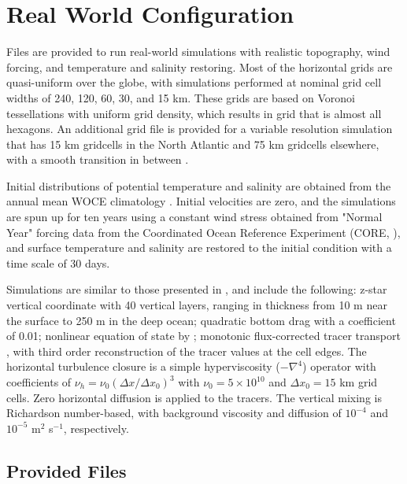 \section{Real World Configuration}
\label{sec:realWorld_description}

Files are provided to run real-world simulations with realistic topography, wind forcing, and temperature and salinity restoring.  
Most of the horizontal grids are quasi-uniform over the globe, with simulations performed at nominal grid cell widths of 240, 120, 60, 30, and 15 km.  These grids are based on Voronoi tessellations with uniform grid density, which results in grid that is almost all hexagons.  An additional grid file is provided for a variable resolution simulation that has 15 km gridcells in the North Atlantic and 75 km gridcells elsewhere, with a smooth transition in between \citep[Figure 2]{Ringler_ea13om}.

Initial distributions of potential temperature and salinity are obtained from the annual mean WOCE climatology \citep{Gouretski:2004wv}.  Initial velocities are zero, and the simulations are spun up for ten years using a constant wind stress obtained from "Normal Year" forcing data from the Coordinated Ocean Reference Experiment (CORE, \citet{Large:2004ug}), and surface temperature and salinity are restored to the initial condition with a time scale of 30 days.  

Simulations are similar to those presented in \citet{Ringler_ea13om}, and include the following: z-star vertical coordinate with 40 vertical layers, ranging in thickness from 10 m near the surface to 250 m in the deep ocean; quadratic bottom drag with a coefficient of 0.01; nonlinear equation of state by \citet{Jackett_McDougall95jaot}; monotonic flux-corrected tracer transport \citep{Skamarock_Gassmann11jcp}, with third order reconstruction of the tracer values at the cell edges.  The horizontal turbulence closure is a simple hyperviscosity ($-\nabla^4$) operator with coefficients of $\nu_h = \nu_0 (\Delta x / \Delta x_0)^3$ with $\nu_0=5\times10^{10}$ and $\Delta x_0=15$ km grid cells.  Zero horizontal diffusion is applied to the tracers.  The vertical mixing is Richardson number-based, with background viscosity and diffusion of $10^{-4}$ and $10^{-5}$ m$^2$ s$^{-1}$, respectively.


\subsection{Provided Files}
\label{subsec:realWorld_files}

